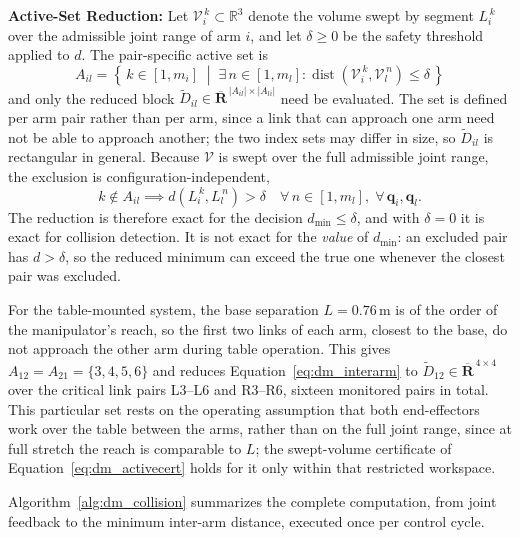 \noindent\textbf{Active-Set Reduction:} Let $\mathcal{V}_i^{\,k} \subset \mathbb{R}^3$ denote the
volume swept by segment $L_i^{\,k}$ over the admissible joint range of arm $i$, and let $\delta \geq 0$
be the safety threshold applied to $d$. The pair-specific active set is
\begin{equation}
A_{il} = \left\{\, k \in [1,m_i] \;\middle|\; \exists\, n \in [1,m_l] :
\operatorname{dist}\!\left(\mathcal{V}_i^{\,k}, \mathcal{V}_l^{\,n}\right) \leq \delta \,\right\}
\label{eq:dm_activeset}
\end{equation}
and only the reduced block $\tilde{D}_{il} \in \overline{\mathbf{R}}^{\,|A_{il}| \times |A_{li}|}$ need be
evaluated. The set is defined per arm pair rather than per arm, since a link that can approach one
arm need not be able to approach another; the two index sets may differ in size, so $\tilde{D}_{il}$
is rectangular in general. Because $\mathcal{V}$ is swept over the full admissible joint range, the
exclusion is configuration-independent,
\begin{equation}
k \notin A_{il} \implies d(L_i^{\,k}, L_l^{\,n}) > \delta \quad \forall\, n \in [1,m_l], \; \forall\, \mathbf{q}_i, \mathbf{q}_l .
\label{eq:dm_activecert}
\end{equation}
The reduction is therefore exact for the decision $d_{\min} \leq \delta$, and with $\delta = 0$ it is
exact for collision detection. It is not exact for the \emph{value} of $d_{\min}$: an excluded pair
has $d > \delta$, so the reduced minimum can exceed the true one whenever the closest pair was
excluded.

For the table-mounted system, the base separation $L = 0.76$\,m is of the order of the manipulator's
reach, so the first two links of each arm, closest to the base, do not approach the other arm during
table operation. This gives $A_{12} = A_{21} = \{3,4,5,6\}$ and reduces
Equation~\eqref{eq:dm_interarm} to $\tilde{D}_{12} \in \overline{\mathbf{R}}^{\,4 \times 4}$ over the
critical link pairs L3--L6 and R3--R6, sixteen monitored pairs in total. This particular set rests on
the operating assumption that both end-effectors work over the table between the arms, rather than on
the full joint range, since at full stretch the reach is comparable to $L$; the swept-volume
certificate of Equation~\eqref{eq:dm_activecert} holds for it only within that restricted workspace.

Algorithm~\ref{alg:dm_collision} summarizes the complete computation, from joint feedback to the
minimum inter-arm distance, executed once per control cycle.

